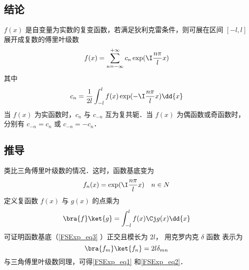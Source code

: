 
\subsection{结论}

$f(x)$ 是自变量为实数的复变函数，若满足狄利克雷条件，则可展在区间 $[ - l,l]$ 展开成复数的傅里叶级数
\begin{equation}\label{FSExp_eq1}
f(x) = \sum_{n =  - \infty }^{ + \infty } c_n \exp ( \I\frac{n\pi }{l}x )
\end{equation}
其中
\begin{equation}\label{FSExp_eq2}
c_n = \frac{1}{2l} \int_{ - l}^l  f(x)\exp( -\I\frac{n\pi }{l}x ) \dd{x} 
\end{equation}
当 $f(x)$ 为实函数时，$c_n$ 与 $c_{-n}$ 互为复共轭．当 $f(x)$ 为偶函数或奇函数时，分别有 $c_{-n} = c_n$ 或 $c_{-n} = -c_n$．

\subsection{推导}
类比三角傅里叶级数的情况．这时，函数基底变为
\begin{equation}\label{FSExp_eq3}
f_n(x) = \exp( \I\frac{n\pi }{l}x ) \quad{n \in N}
\end{equation} 
定义复函数 $f(x)$ 与 $g(x)$ 的点乘为
\begin{equation}
\bra{f}\ket{g} = \int_{-l}^{l}  f(x)\Cj g(x) \dd{x}
\end{equation}
可证明函数基底（\autoref{FSExp_eq3} ）正交且模长为 $2l$， 用克罗内克 $\delta$ 函数%
表示为
\begin{equation}
\bra{f_m}\ket{f_n} = 2l \delta_{mn}
\end{equation}
与三角傅里叶级数同理，可得\autoref{FSExp_eq1} 和\autoref{FSExp_eq2}．

